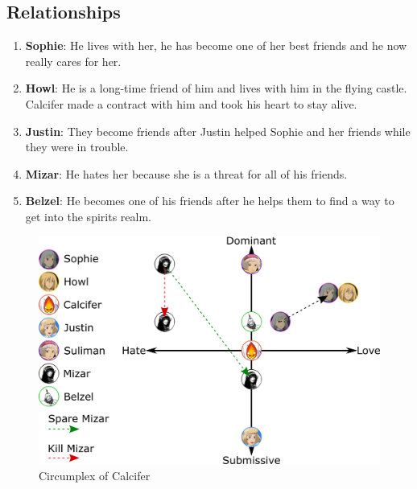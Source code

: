 \subsection{Relationships}
\begin{enumerate}
\item \textbf{Sophie}: He lives with her, he has become one of her best friends and he now really cares for her.
\item \textbf{Howl}: He is a long-time friend of him and lives with him in the flying castle. Calcifer made a contract with him and took his heart to stay alive.
\item \textbf{Justin}: They become friends after Justin helped Sophie and her friends while they were in trouble.
\item \textbf{Mizar}: He hates her because she is a threat for all of his friends.
\item \textbf{Belzel}: He becomes one of his friends after he helps them to find a way to get into the spirits realm.
\end{enumerate}

\begin{figure}[H]
  \centering
  \includegraphics[width=14cm]{Images/Diagrams/Circumplexes/calciferCircumplex}
  \caption{Circumplex of Calcifer}
\end{figure}

